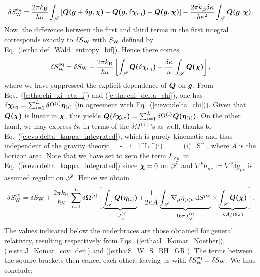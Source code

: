 \[
     \delta S_{\rm W}^{\rm eq} = \frac{2 \pi k_{\rm B}}{\hbar\kappa} \int_{\hat{\mathscr{S}}}
    \left[  \bm{Q}\textbf{(}\bm{g} + \delta\bm{g},\bm{\chi}\textbf{)} + \bm{Q}\textbf{(}\bm{g},\delta\bm{\chi}_{\rm eq}\textbf{)}
    -  \bm{Q}\textbf{(}\bm{g},\bm{\chi}\textbf{)} \right]
    - \frac{2 \pi k_{\rm B}\delta\kappa}{\hbar\kappa^2} \int_{\hat{\mathscr{S}}} \bm{Q}\textbf{(}\bm{g},\bm{\chi}\textbf{)}  .
\]
Now, the difference between the first and third terms in the first integral
corresponds exactly to $\delta S_{\rm W}$ with $S_{\rm W}$ defined
by Eq.~(\ref{e:tha:def_Wald_entropy_bif}). Hence there comes
\[
     \delta S_{\rm W}^{\rm eq} =  \delta S_{\rm W}
     + \frac{2 \pi k_{\rm B}}{\hbar\kappa} \left[
     \int_{\hat{\mathscr{S}}} \bm{Q}\textbf{(}\delta\bm{\chi}_{\rm eq}\textbf{)}
     - \frac{\delta\kappa}{\kappa}  \int_{\hat{\mathscr{S}}} \bm{Q}\textbf{(}\bm{\chi}\textbf{)}
     \right] ,
\]
where we have suppressed the  explicit dependence of $\bm{Q}$ on $\bm{g}$.
From Eqs.~(\ref{e:tha:chi_xi_eta_i}) and (\ref{e:tha:chi_delta_chi}), one
has $\delta\bm{\chi}_{\rm eq} =  \sum_{i=1}^{L} \delta\Omega^{(i)} \bm{\eta}_{(i)}$
(in agreement with Eq.~(\ref{e:evo:delta_chi})).
Given that $\bm{Q}\textbf{(}\bm{\chi}\textbf{)}$ is linear in $\bm{\chi}$, this
yields $\bm{Q}\textbf{(}\delta\bm{\chi}_{\rm eq}\textbf{)} =  \sum_{i=1}^{L} \delta\Omega^{(i)} \bm{Q}\textbf{(}\bm{\eta}_{(i)}\textbf{)}$.
On the other hand, we may express $\delta\kappa$ in terms of the $\delta\Omega^{(i)}$'s as well,
thanks to Eq.~(\ref{e:evo:delta_kappa_integrated}), which is purely kinematic and thus
independent of the gravity theory:
\be
    \delta\kappa = - \sum_{i=1}^L  \delta\Omega^{(i)}
    \int_{\hat{\Sp}} \nabla_\mu \eta_{(i)\nu} \, \D S^{\mu\nu} ,
\ee
where $A$ is the horizon area. Note that we have set to zero the term $I_{\mathscr{S}_k}$
in Eq.~(\ref{e:evo:delta_kappa_integrated}) since $\bm{\chi} = 0$ on $\hat{\mathscr{S}}$
and $\nabla^\nu h_{\mu\nu} := \nabla^\nu \delta g_{\mu\nu}$ is assumed
regular on $\hat{\mathscr{S}}$.  Hence we obtain
\[
    \delta S_{\rm W}^{\rm eq} =  \delta S_{\rm W}
     + \frac{2 \pi k_{\rm B}}{\hbar\kappa}
     \sum_{i=1}^L  \delta\Omega^{(i)}\Bigg[
     \underbrace{\int_{\hat{\mathscr{S}}}  \bm{Q}\textbf{(}\bm{\eta}_{(i)}\textbf{)}}_{-J^{(i)}_{\hat{\mathscr{S}}}}
     + \frac{1}{2\kappa A}
     \underbrace{\int_{\hat{\mathscr{S}}} \nabla_\mu \eta_{(i)\nu} \, \mathrm{d} S^{\mu\nu}}_{16\pi J^{(i)}_{\hat{\mathscr{S}}}}
     \times
     \underbrace{\int_{\hat{\mathscr{S}}} \bm{Q}\textbf{(}\bm{\chi}\textbf{)}}_{\kappa A/(8\pi)}
     \Bigg] .
\]
The values indicated below the underbraces are those obtained for general relativity,
resulting respectively from Eqs.~(\ref{e:tha:J_Komar_Noether}),
(\ref{e:sta:J_Komar_cov_der}) and (\ref{e:tha:S_W_S_BH_GR}).
The terms between the square brackets then cancel each other, leaving us
with $\delta S_{\rm W}^{\rm eq} =  \delta S_{\rm W}$.
We thus conclude:

